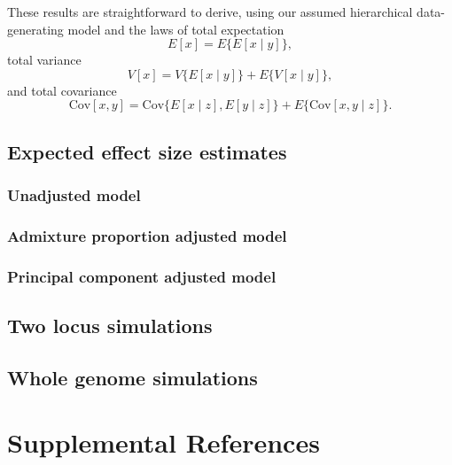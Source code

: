 \documentclass[12pt]{article}
\newcommand{\edit}[1]{{\color{red}{#1}}}
\begin{document}
These results are straightforward to derive, using our assumed hierarchical data-generating model and the laws of total expectation $$E[x] = E\{E[x\mid y]\},$$ total variance $$V[x] = V\{E[x\mid y]\} + E\{ V[x \mid y] \},$$ and total covariance $$\text{Cov}[x,y] = \text{Cov}\{E[x\mid z], E[y\mid z]\} + E\{ \text{Cov}[x,y \mid z] \}.$$

\subsection{Expected effect size estimates}

\subsubsection{Unadjusted model}

\subsubsection{Admixture proportion adjusted model}

\subsubsection{Principal component adjusted model}


\subsection{Two locus simulations}

\edit{pull from dissertation}

\subsection{Whole genome simulations}

\edit{add new TOPMed simulations}

\section{Supplemental References}


\end{document}
